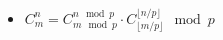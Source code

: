 \begin{itemize}
    \item $C^n_m = C^{n \mod p}_{m \mod p} \cdot C^{\lfloor n / p \rfloor}_{\lfloor m / p \rfloor} \mod p$
\end{itemize}
